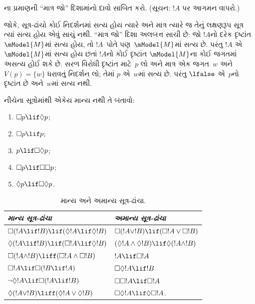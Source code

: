 \begin{prob}
  ના પ્રમાણની
  ``માત્ર જો'' દિશામાંનો દાવો સાબિત કરો. (સૂચન:
  $!A$ પર આગમન વાપરો.)
\end{prob}

જોકે, સૂત્ર-ઢાંચો કોઈ નિદર્શનમાં સત્ય હોય ત્યારે
અને માત્ર ત્યારે જ તેનું લક્ષણરૂપ સૂત્ર ત્યાં સત્ય
હોય એવું સાચું નથી. ``માત્ર જો'' દિશા અલબત્ત સાચી છે:
જો $!A$નો દરેક દૃષ્ટાંત~$\mModel{M}$માં સત્ય હોય,
તો $!A$~પોતે પણ~$\mModel{M}$માં સત્ય છે. પરંતુ
$!A$ એ~$\mModel{M}$માં સત્ય હોય છતાં $!A$નો કોઈ દૃષ્ટાંત
$\mModel{M}$ના કોઈ જગતમાં અસત્ય હોઈ શકે છે. સરળ
વિરોધી દૃષ્ટાંત માટે~$p$ લો અને માત્ર એક જગત~$w$ અને
$V(p) = \{w\}$ ધરાવતું નિદર્શન લો; તેમાં $p$
એ~$w$માં સત્ય છે. પરંતુ $\lfalse$ એ~$p$નો
દૃષ્ટાંત છે અને~$w$માં સત્ય નથી.

\begin{prob}
  નીચેના સૂત્રોમાંથી એકેય માન્ય નથી તે બતાવો:
  \begin{enumerate}
    \item[\Ax{D}:] \quad $\Box p \lif \Diamond p$;
    \item[\Ax{T}:] \quad $\Box p \lif p$;
    \item[\Ax{B}:] \quad $p \lif \Box\Diamond p$;
    \item[\Ax{4}:] \quad $\Box p \lif \Box \Box p$;
    \item[\Ax{5}:] \quad $\Diamond p \lif \Box \Diamond
      p$.
  \end{enumerate}
\end{prob}

\begin{table}[t]
    \centering
    \begin{tabular}{| l || l |}
      \hline
      {\emph{માન્ય સૂત્ર-ઢાંચા}} & {\emph{અમાન્ય સૂત્ર-ઢાંચા}} \\
      \hline\hline
      $\Box(!A \lif !B) \lif (\Diamond !A \lif \Diamond !B)$
      & $\Box (!A \lor !B) \lif (\Box !A \lor \Box !B)$ \\
      $\Diamond (!A \lif !B) \lif (\Box !A \lif \Diamond
      !B)$
      & $(\Diamond !A \land \Diamond !B) \lif \Diamond (!A
      \land !B)$\\
      $\Box (!A \land !B) \liff (\Box !A \land \Box !B)$
      & $!A \lif \Box !A$ \\
      $\Box !A \lif \Box (!B \lif !A)$
      & $\Box \Diamond !A \lif !B$ \\
      $\lnot \Diamond !A \lif \Box (!A \lif !B)$
      & $\Box \Box !A \lif \Box !A$ \\
      $\Diamond (!A \lor !B) \liff (\Diamond !A \lor
      \Diamond !B)$
      & $\Box \Diamond !A \lif \Diamond \Box !A$. \\
      \hline
    \end{tabular}
    \caption{માન્ય અને અમાન્ય સૂત્ર-ઢાંચા.}
\end{table}

